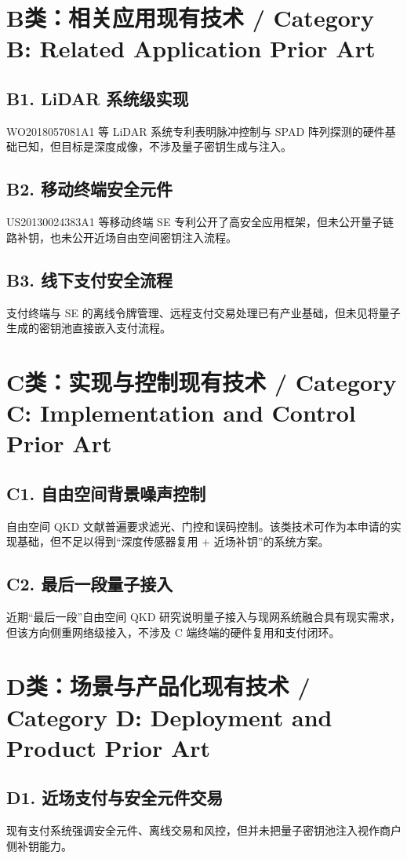 ﻿\documentclass[12pt,a4paper]{article}
\begin{document}
\section{B类：相关应用现有技术 / Category B: Related Application Prior Art}
\subsection{B1. LiDAR 系统级实现}
WO2018057081A1 等 LiDAR 系统专利表明脉冲控制与 SPAD 阵列探测的硬件基础已知，但目标是深度成像，不涉及量子密钥生成与注入。

\subsection{B2. 移动终端安全元件}
US20130024383A1 等移动终端 SE 专利公开了高安全应用框架，但未公开量子链路补钥，也未公开近场自由空间密钥注入流程。

\subsection{B3. 线下支付安全流程}
支付终端与 SE 的离线令牌管理、远程支付交易处理已有产业基础，但未见将量子生成的密钥池直接嵌入支付流程。

\section{C类：实现与控制现有技术 / Category C: Implementation and Control Prior Art}
\subsection{C1. 自由空间背景噪声控制}
自由空间 QKD 文献普遍要求滤光、门控和误码控制。该类技术可作为本申请的实现基础，但不足以得到“深度传感器复用 + 近场补钥”的系统方案。

\subsection{C2. 最后一段量子接入}
近期“最后一段”自由空间 QKD 研究说明量子接入与现网系统融合具有现实需求，但该方向侧重网络级接入，不涉及 C 端终端的硬件复用和支付闭环。

\section{D类：场景与产品化现有技术 / Category D: Deployment and Product Prior Art}
\subsection{D1. 近场支付与安全元件交易}
现有支付系统强调安全元件、离线交易和风控，但并未把量子密钥池注入视作商户侧补钥能力。
\end{document}
